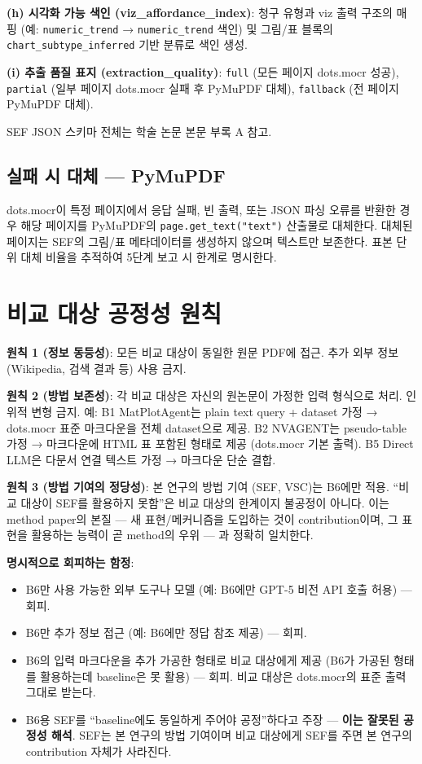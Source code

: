 \documentclass[11pt]{article}
\begin{document}
\textbf{(h) 시각화 가능 색인 (viz\_affordance\_index)}: 청구 유형과 viz 출력 구조의 매핑 (예: \texttt{numeric\_trend} → \texttt{numeric\_trend} 색인) 및 그림/표 블록의 \texttt{chart\_subtype\_inferred} 기반 분류로 색인 생성.

\textbf{(i) 추출 품질 표지 (extraction\_quality)}: \texttt{full} (모든 페이지 dots.mocr 성공), \texttt{partial} (일부 페이지 dots.mocr 실패 후 PyMuPDF 대체), \texttt{fallback} (전 페이지 PyMuPDF 대체).

SEF JSON 스키마 전체는 학술 논문 본문 부록 A 참고.

\subsection{실패 시 대체 — PyMuPDF}

dots.mocr이 특정 페이지에서 응답 실패, 빈 출력, 또는 JSON 파싱 오류를 반환한 경우 해당 페이지를 PyMuPDF의 \texttt{page.get\_text("text")} 산출물로 대체한다. 대체된 페이지는 SEF의 그림/표 메타데이터를 생성하지 않으며 텍스트만 보존한다. 표본 단위 대체 비율을 추적하여 5단계 보고 시 한계로 명시한다.

\section{비교 대상 공정성 원칙}
\label{sec:fairness}

\textbf{원칙 1 (정보 동등성)}: 모든 비교 대상이 동일한 원문 PDF에 접근. 추가 외부 정보 (Wikipedia, 검색 결과 등) 사용 금지.

\textbf{원칙 2 (방법 보존성)}: 각 비교 대상은 자신의 원논문이 가정한 입력 형식으로 처리. 인위적 변형 금지. 예: B1 MatPlotAgent는 plain text query + dataset 가정 → dots.mocr 표준 마크다운을 전체 dataset으로 제공. B2 NVAGENT는 pseudo-table 가정 → 마크다운에 HTML 표 포함된 형태로 제공 (dots.mocr 기본 출력). B5 Direct LLM은 다문서 연결 텍스트 가정 → 마크다운 단순 결합.

\textbf{원칙 3 (방법 기여의 정당성)}: 본 연구의 방법 기여 (SEF, VSC)는 B6에만 적용. ``비교 대상이 SEF를 활용하지 못함''은 비교 대상의 한계이지 불공정이 아니다. 이는 method paper의 본질 — 새 표현/메커니즘을 도입하는 것이 contribution이며, 그 표현을 활용하는 능력이 곧 method의 우위 — 과 정확히 일치한다.

\textbf{명시적으로 회피하는 함정}:
\begin{itemize}[leftmargin=*]
    \item B6만 사용 가능한 외부 도구나 모델 (예: B6에만 GPT-5 비전 API 호출 허용) — 회피.
    \item B6만 추가 정보 접근 (예: B6에만 정답 참조 제공) — 회피.
    \item B6의 입력 마크다운을 추가 가공한 형태로 비교 대상에게 제공 (B6가 가공된 형태를 활용하는데 baseline은 못 활용) — 회피. 비교 대상은 dots.mocr의 표준 출력 그대로 받는다.
    \item B6용 SEF를 ``baseline에도 동일하게 주어야 공정''하다고 주장 — \textbf{이는 잘못된 공정성 해석}. SEF는 본 연구의 방법 기여이며 비교 대상에게 SEF를 주면 본 연구의 contribution 자체가 사라진다.
\end{itemize}
\end{document}
